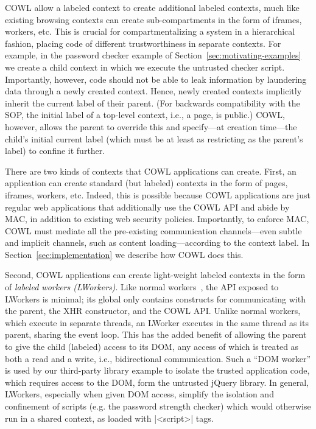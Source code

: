 COWL allow a labeled context to create additional labeled contexts,
much like existing browsing contexts can create sub-compartments
in the form of iframes, workers, etc.
%
This is crucial for compartmentalizing a system in a hierarchical
fashion, placing code of different trustworthiness in separate contexts.
%
For example, in the password checker example of
Section~\ref{sec:motivating-examples} we create a child context in
which we execute the untrusted checker script.
%
Importantly, however, code should not be able to leak information by
laundering data through a newly created context.
%
Hence, newly created contexts implicitly inherit the current label of
their parent.
%
(For backwards compatibility with the SOP, the initial label of a
top-level context, i.e., a page, is public.) 
%
COWL, however, allows the parent to override this and specify---at
creation time---the child's initial current label (which must be at
least as restricting as the parent's label) to confine it further.

There are two kinds of contexts that COWL applications can create.
%
First, an application can create standard (but labeled) contexts in
the form of pages, iframes, workers, etc.
%
Indeed, this is possible because COWL applications are just regular
web applications that additionally use the COWL API and abide by MAC,
in addition to existing web security policies.
%
Importantly, to enforce MAC, COWL must mediate all the pre-existing
communication channels---even subtle and implicit channels, such as
content loading---according to the context label.
%
In Section~\ref{sec:implementation} we describe how COWL does this.

Second, COWL applications can create light-weight labeled contexts
in the form of \emph{labeled workers (LWorkers)}.
%
Like normal workers~\cite{workers}, the API exposed to LWorkers is
minimal; its global only contains constructs for communicating
with the parent, the XHR constructor, and the COWL API.
%
Unlike normal workers, which execute in separate threads, an LWorker
executes in the same thread as its parent, sharing the event loop.
%
This has the added benefit of allowing the parent to give the child
(labeled) access to its DOM, any access of which is treated as both a
read and a write, i.e., bidirectional communication.
%
Such a ``DOM worker'' is used by our third-party library example to
isolate the trusted application code, which requires access to the
DOM, form the untrusted jQuery library.
%
In general, LWorkers, especially when given DOM access, simplify the
isolation and confinement of scripts (e.g. the password strength
checker) which would otherwise run in a shared context, as loaded with
\js|<script>| tags.


